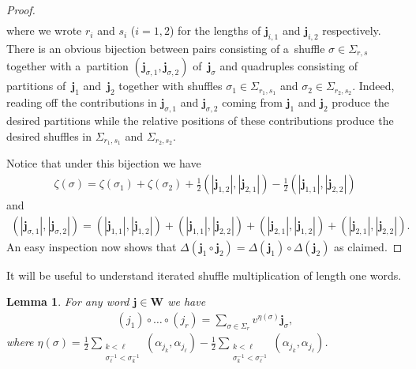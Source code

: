 \documentclass[pdftex]{sigma}
\numberwithin{equation}{section}
\newtheorem{Lemma}[Theorem]{Lemma}
\begin{document}
\begin{proof}
\begin{gather*}
\end{gather*}
where we wrote $r_i$ and $s_i$ ($i=1,2$) for the lengths of $\mathbf{j}_{i,1}$ and $\mathbf{j}_{i,2}$ respectively.
There is an obvious bijection between pairs consisting of a~shuf\/f\/le $\sigma\in\Sigma_{r,s}$ together with a~partition
$(\mathbf{j}_{\sigma,1},\mathbf{j}_{\sigma,2})$ of~$\mathbf{j}_\sigma$ and quadruples consisting of partitions of~$\mathbf{j}_1$ and~$\mathbf{j}_2$ together with shuf\/f\/les $\sigma_1\in\Sigma_{r_1,s_1}$ and
$\sigma_2\in\Sigma_{r_2,s_2}$.
Indeed, reading of\/f the contributions in $\mathbf{j}_{\sigma,1}$ and $\mathbf{j}_{\sigma,2}$ coming from $\mathbf{j}_1$
and $\mathbf{j}_2$ produce the desired partitions while the relative positions of these contributions produce the
desired shuf\/f\/les in $\Sigma_{r_1,s_1}$ and $\Sigma_{r_2,s_2}$.

Notice that under this bijection we have
\begin{gather*}
\zeta(\sigma)=\zeta(\sigma_1)+\zeta(\sigma_2)+\frac{1}{2}(|\mathbf{j}_{1,2}|,|\mathbf{j}_{2,1}|)-\frac{1}{2}(|\mathbf{j}_{1,1}|,|\mathbf{j}_{2,2}|)
\end{gather*}
and
\begin{gather*}
(|\mathbf{j}_{\sigma,1}|,|\mathbf{j}_{\sigma,2}|)
=(|\mathbf{j}_{1,1}|,|\mathbf{j}_{1,2}|)+(|\mathbf{j}_{1,1}|,|\mathbf{j}_{2,2}|)
+(|\mathbf{j}_{2,1}|,|\mathbf{j}_{1,2}|)+(|\mathbf{j}_{2,1}|,|\mathbf{j}_{2,2}|).
\end{gather*}
An easy inspection now shows that $\Delta(\mathbf{j}_1\circ\mathbf{j}_2)=\Delta(\mathbf{j}_1)\circ\Delta(\mathbf{j}_2)$
as claimed.
\end{proof}

It will be useful to understand iterated shuf\/f\/le multiplication of length one words.
\begin{Lemma}
For any word $\mathbf{j}\in\mathbf{W}$ we have
\begin{gather*}
(j_1)\circ\dots\circ(j_r)=\sum\limits_{\sigma\in\Sigma_r}v^{\eta(\sigma)}\mathbf{j}_\sigma,
\end{gather*}
where $\eta(\sigma)=\frac{1}{2}\sum\limits_{\substack{k<\ell\\ \sigma_\ell^{-1}<\sigma_k^{-1}}}(\alpha_{j_k},\alpha_{j_\ell})
-\frac{1}{2}\sum\limits_{\substack{k<\ell\\ \sigma_k^{-1}<\sigma_\ell^{-1}}}(\alpha_{j_k},\alpha_{j_\ell})$.
\end{Lemma}
\end{document}
